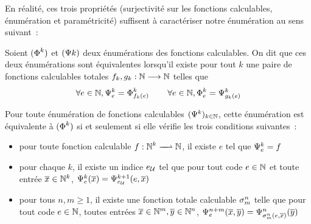 En réalité, ces trois propriétés (surjectivité sur les fonctions calculables,
énumération et paramétricité) suffisent à caractériser notre énumération au
sens suivant~:

\begin{definition}
  Soient $(\operatorname{\Phi}_{}^{k})$ et $(\Psi{}{k})$ deux énumérations des fonctions
  calculables. On dit que ces deux énumérations sont équivalentes lorsqu'il
  existe pour tout $k$ une paire de fonctions calculables totales
  $f_k,g_k : \displaystyle \mathbb N \longrightarrow \mathbb N$ telles que
  \[\forall e \in \mathbb N, \Psi_{e}^{k} = \operatorname{\Phi}_{f_k(e)}^{k}\qquad
  \forall e \in \mathbb N, \operatorname{\Phi}_{e}^{k} = \Psi_{g_k(e)}^{k}\]
\end{definition}

\begin{proposition}
  Pour toute énumération de fonctions calculables $(\Psi_{}^{k})_{k \in \mathbb N}$,
  cette énumération est équivalente à $(\operatorname{\Phi}_{}^{k})$ si et seulement si elle
  vérifie les trois conditions suivantes~:
  \begin{itemize}
  \item pour toute fonction calculable $\makeFunNamePartial{f}{\bN^k}{\bN}$,
    il existe $e$ tel que $\Psi_{e}^{k} = f$
  \item pour chaque $k$,
    il existe un indice $e_{\mathcal{U}}$ tel que pour tout code $e \in \mathbb N$
    et toute entrée $\overline{x} \in \mathbb N^k$,
    $\Psi_{e}^{k}(\overline{x}) = \Psi_{e_{\mathcal{U}}}^{k+1}(e,\overline{x})$
  \item pour tous $n,m \geq 1$, il existe une fonction totale calculable
    $\sigma_{m}^{n}$ telle que pour tout code $e \in \mathbb N$, toutes entrées
    $\overline{x} \in \mathbb N^m, \overline{y} \in \mathbb N^n$,
    $\Psi_{e}^{n+m}(\overline{x},\overline{y}) = \Psi_{\sigma_{m}^{n}(e,\overline{x})}^{n}(\overline{y})$
  \end{itemize}
\end{proposition}

